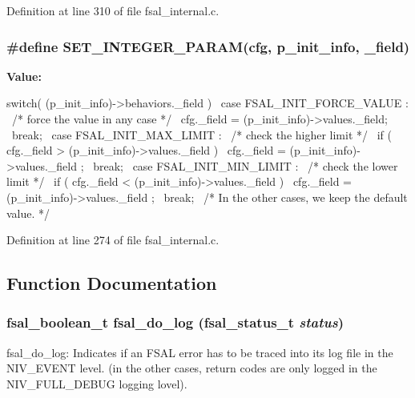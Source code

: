 Definition at line 310 of file fsal\_\-internal.c.
\subsubsection[{SET\_\-INTEGER\_\-PARAM}]{\setlength{\rightskip}{0pt plus 5cm}\#define SET\_\-INTEGER\_\-PARAM(cfg, \/  p\_\-init\_\-info, \/  \_\-field)}\label{fsal__internal_8c_a1338c45d33ed60654787c72596f36adc}
{\bfseries Value:}
\begin{DoxyCode}
switch( (p_init_info)->behaviors._field ){                    \
    case FSAL_INIT_FORCE_VALUE :                                  \
      /* force the value in any case */                           \
      cfg._field = (p_init_info)->values._field;                  \
      break;                                                      \
    case FSAL_INIT_MAX_LIMIT :                                    \
      /* check the higher limit */                                \
      if ( cfg._field > (p_init_info)->values._field )            \
        cfg._field = (p_init_info)->values._field ;               \
      break;                                                      \
    case FSAL_INIT_MIN_LIMIT :                                    \
      /* check the lower limit */                                 \
      if ( cfg._field < (p_init_info)->values._field )            \
        cfg._field = (p_init_info)->values._field ;               \
      break;                                                      \
    /* In the other cases, we keep the default value. */          \
    }
\end{DoxyCode}


Definition at line 274 of file fsal\_\-internal.c.

\subsection{Function Documentation}
\subsubsection[{fsal\_\-do\_\-log}]{\setlength{\rightskip}{0pt plus 5cm}fsal\_\-boolean\_\-t fsal\_\-do\_\-log (fsal\_\-status\_\-t {\em status})}\label{fsal__internal_8c_a07976458ca604abb5159c050190c53d4}
fsal\_\-do\_\-log: Indicates if an FSAL error has to be traced into its log file in the NIV\_\-EVENT level. (in the other cases, return codes are only logged in the NIV\_\-FULL\_\-DEBUG logging lovel).


